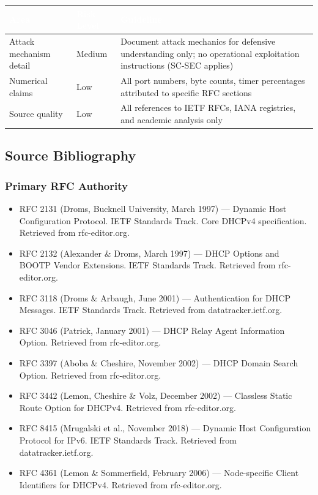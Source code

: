 \documentclass[11pt,letterpaper]{article}
\newcommand{\tableheader}[1]{\textbf{\sffamily\textcolor{white}{#1}}}
\begin{document}
\begin{center}
\begin{tabularx}{\textwidth}{L{3cm}C{2cm}X}
\toprule
{}
\tableheader{Area} & \tableheader{Risk Level} & \tableheader{Guideline} \\
\midrule
Attack mechanism detail & Medium & Document attack mechanics for defensive understanding only; no operational exploitation instructions (SC-SEC applies) \\
Numerical claims & Low & All port numbers, byte counts, timer percentages attributed to specific RFC sections \\
Source quality & Low & All references to IETF RFCs, IANA registries, and academic analysis only \\
\bottomrule
\end{tabularx}
\end{center}

\subsection{Source Bibliography}

\subsubsection{Primary RFC Authority}

\begin{itemize}[noitemsep]
  \item RFC 2131 (Droms, Bucknell University, March 1997) --- Dynamic Host Configuration Protocol. IETF Standards Track. Core DHCPv4 specification. Retrieved from rfc-editor.org.
  \item RFC 2132 (Alexander \& Droms, March 1997) --- DHCP Options and BOOTP Vendor Extensions. IETF Standards Track. Retrieved from rfc-editor.org.
  \item RFC 3118 (Droms \& Arbaugh, June 2001) --- Authentication for DHCP Messages. IETF Standards Track. Retrieved from datatracker.ietf.org.
  \item RFC 3046 (Patrick, January 2001) --- DHCP Relay Agent Information Option. Retrieved from rfc-editor.org.
  \item RFC 3397 (Aboba \& Cheshire, November 2002) --- DHCP Domain Search Option. Retrieved from rfc-editor.org.
  \item RFC 3442 (Lemon, Cheshire \& Volz, December 2002) --- Classless Static Route Option for DHCPv4. Retrieved from rfc-editor.org.
  \item RFC 8415 (Mrugalski et al., November 2018) --- Dynamic Host Configuration Protocol for IPv6. IETF Standards Track. Retrieved from datatracker.ietf.org.
  \item RFC 4361 (Lemon \& Sommerfield, February 2006) --- Node-specific Client Identifiers for DHCPv4. Retrieved from rfc-editor.org.
\end{itemize}
\end{document}
